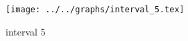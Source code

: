 \begin{figure}[h] \centering\texttt{[image: ../../graphs/interval\_5.tex]}\caption{interval 5}\label{gr:interval_5} \end{figure}
